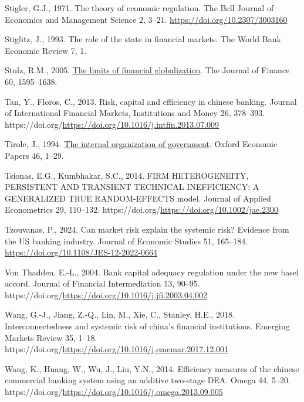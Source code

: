 \documentclass[
  12pt,
  a4paper,
  DIV=11,
  numbers=noendperiod]{scrreprt}
\newlength{\cslhangindent}
\newenvironment{CSLReferences}[2] %
 {\begin{list}{}{%
  \setlength{\itemindent}{0pt}
  \setlength{\leftmargin}{0pt}
  \setlength{\parsep}{0pt}
  \ifodd #1
   \setlength{\leftmargin}{\cslhangindent}
   \setlength{\itemindent}{-1\cslhangindent}
  \fi
  \setlength{\itemsep}{#2\baselineskip}}}
 {\end{list}}
\begin{document}
\begin{CSLReferences}{1}{0}
Stigler, G.J., 1971. The theory of economic regulation. The Bell Journal
of Economics and Management Science 2, 3--21.
\url{https://doi.org/10.2307/3003160}

Stiglitz, J., 1993. The role of the state in financial markets. The
World Bank Economic Review 7, 1.

Stulz, R.M., 2005.
\href{http://www.jstor.org.queens.ezp1.qub.ac.uk/stable/3694849}{The
limits of financial globalization}. The Journal of Finance 60,
1595--1638.

Tan, Y., Floros, C., 2013. Risk, capital and efficiency in chinese
banking. Journal of International Financial Markets, Institutions and
Money 26, 378--393.
https://doi.org/\url{https://doi.org/10.1016/j.intfin.2013.07.009}

Tirole, J., 1994. \href{http://www.jstor.org/stable/2663521}{The
internal organization of government}. Oxford Economic Papers 46, 1--29.

Tsionas, E.G., Kumbhakar, S.C., 2014. FIRM HETEROGENEITY, PERSISTENT AND
TRANSIENT TECHNICAL INEFFICIENCY: A GENERALIZED TRUE RANDOM-EFFECTS
model. Journal of Applied Econometrics 29, 110--132.
https://doi.org/\url{https://doi.org/10.1002/jae.2300}

Tzouvanas, P., 2024. Can market risk explain the systemic risk? Evidence
from the US banking industry. Journal of Economic Studies 51, 165--184.
\url{https://doi.org/10.1108/JES-12-2022-0664}

Von Thadden, E.-L., 2004. Bank capital adequacy regulation under the new
basel accord. Journal of Financial Intermediation 13, 90--95.
https://doi.org/\url{https://doi.org/10.1016/j.jfi.2003.04.002}

Wang, G.-J., Jiang, Z.-Q., Lin, M., Xie, C., Stanley, H.E., 2018.
Interconnectedness and systemic risk of china's financial institutions.
Emerging Markets Review 35, 1--18.
https://doi.org/\url{https://doi.org/10.1016/j.ememar.2017.12.001}

Wang, K., Huang, W., Wu, J., Liu, Y.N., 2014. Efficiency measures of the
chinese commercial banking system using an additive two-stage DEA. Omega
44, 5--20.
https://doi.org/\url{https://doi.org/10.1016/j.omega.2013.09.005}


\end{CSLReferences}
\end{document}
